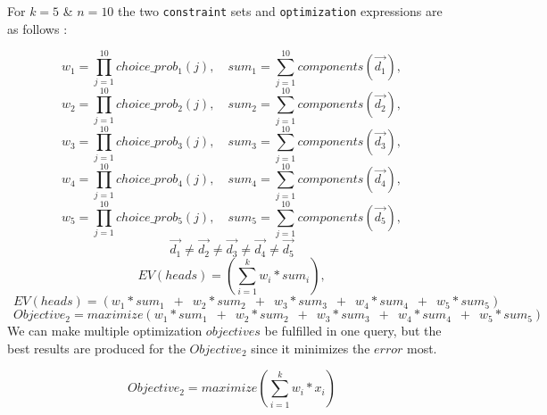 \documentclass[usenames,dvipsnames,acmsmall]{acmart}
\begin{document}
For $k = 5$ \& $n = 10$ the two \texttt{constraint} sets and \texttt{optimization} expressions are as follows : 

\begin{equation}	
	w_1 = \prod_{j=1}^{10} choice\_prob_{1}(j) ,
	\quad
	sum_1 = \sum_{j=1}^{10} components(\vec{d_1}) ,
\end{equation}
\begin{equation}	
	w_2 = \prod_{j=1}^{10} choice\_prob_{2}(j) ,
	\quad
	sum_2 = \sum_{j=1}^{10} components(\vec{d_2}) ,
\end{equation}
\begin{equation}	
	w_3 = \prod_{j=1}^{10} choice\_prob_{3}(j) ,
	\quad
	sum_3 = \sum_{j=1}^{10} components(\vec{d_3}) ,
\end{equation}
\begin{equation}	
	w_4 = \prod_{j=1}^{10} choice\_prob_{4}(j) ,
	\quad
	sum_4 = \sum_{j=1}^{10} components(\vec{d_4}) ,
\end{equation}
\begin{equation}	
	w_5 = \prod_{j=1}^{10} choice\_prob_{5}(j) ,
	\quad
	sum_5 = \sum_{j=1}^{10} components(\vec{d_5}) ,
\end{equation}
\begin{equation}
	\vec{d_1} \neq \vec{d_2} \neq \vec{d_3} \neq \vec{d_4} \neq \vec{d_5}
\end{equation}
\begin{equation}
	EV(heads) = (\sum_{i=1}^{k}{w_i * sum_i}),
\end{equation}
\begin{equation}
	\enspace
	EV(heads) = (w_1 * sum_1 \enspace + \enspace w_2 * sum_2 \enspace + \enspace w_3 * sum_3 \enspace + \enspace w_4 * sum_4 \enspace + \enspace w_5 * sum_5)
\end{equation}
\begin{equation}
	\enspace
	Objective_2 = maximize(w_1 * sum_1 \enspace + \enspace w_2 * sum_2 \enspace + \enspace w_3 * sum_3 \enspace + \enspace w_4 * sum_4 \enspace + \enspace w_5 * sum_5)
\end{equation}
We can make multiple optimization $objectives$ be fulfilled in one query, but the best results are produced for the $Objective_2$ since it minimizes the $error$ most.

\begin{equation}
	Objective_{2} = maximize(\sum_{i=1}^{k}{w_i * x _i})
\end{equation}
\end{document}
